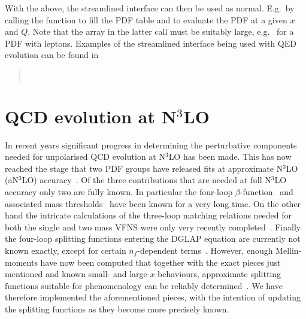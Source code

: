 With the above, the streamlined interface can then be used as normal.
%
E.g.\ by calling the  function to fill the PDF
table and  to evaluate the PDF at a given $x$
and $Q$.
%
Note that the  array in the latter call must be
suitably large, e.g.\  for a PDF with leptons.
%
Examples of the streamlined interface being used with QED evolution
can be found in
\begin{quote}
  \\
\end{quote}

\section{QCD evolution at N$^3$LO}
\label{sec:n3lo-evolution}
In recent years significant progress in determining the perturbative
components needed for unpolarised QCD evolution at N$^3$LO has been
made.
%
This has now reached the stage that two PDF groups have released fits at
approximate N$^3$LO (aN$^3$LO)
accuracy~\cite{McGowan:2022nag,NNPDF:2024nan}.
%
Of the three contributions that are needed at full N$^3$LO accuracy
only two are fully known.
%
In particular the four-loop
$\beta$-function~\cite{vanRitbergen:1997va,Czakon:2004bu} and
associated mass thresholds~\cite{Chetyrkin:1997sg} have been known for
a very long time.
%
On the other hand the intricate calculations of the three-loop
matching relations needed for both the single and two mass VFNS were
only very recently
completed~\cite{Bierenbaum:2009mv,Ablinger:2010ty,Kawamura:2012cr,Blumlein:2012vq,ABLINGER2014263,Ablinger:2014nga,Ablinger:2014vwa,Behring:2014eya,Ablinger:2019etw,Behring:2021asx,Ablinger:2023ahe,Ablinger:2024xtt}.
%
Finally the four-loop splitting functions entering the DGLAP equation
are currently not known exactly, except for certain $n_f$-dependent
terms~\cite{Gracey:1994nn,Davies:2016jie,Moch:2017uml,Gehrmann:2023cqm,Falcioni:2023tzp,Gehrmann:2023iah}.
%
However, enough Mellin-moments have now been computed that together
with the exact pieces just mentioned and known small- and large-$x$
behaviours, approximate splitting functions suitable for phenomenology
can be reliably
determined~\cite{McGowan:2022nag,NNPDF:2024nan,Moch:2021qrk,Falcioni:2023luc,Falcioni:2023vqq,Moch:2023tdj,Falcioni:2024xyt,Falcioni:2024qpd}.
%
We have therefore implemented the aforementioned pieces, with the
intention of updating the splitting functions as they become more
precisely known.

